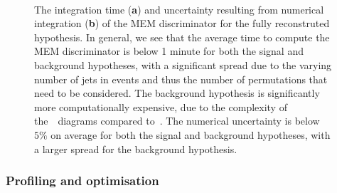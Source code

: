 \begin{figure}
\begin{centering}
\\
\caption{The integration time (\textbf{a}) and uncertainty resulting from numerical integration (\textbf{b}) of the MEM discriminator for the fully reconstruted hypothesis. In general, we see that the average time to compute the MEM discriminator is below 1 minute for both the signal and background hypotheses, with a significant spread due to the varying number of jets in events and thus the number of permutations that need to be considered. The background hypothesis is significantly more computationally expensive, due to the complexity of the~\ttbb~diagrams compared to~\ttHbb. The numerical uncertainty is below $5\%$ on average for both the signal and background hypotheses, with a larger spread for the background hypothesis.}
\label{fig:mem_numerical_accuracy}
\end{centering}
\end{figure}

\subsubsection{Profiling and optimisation}
\label{sec:mem_optimization}

